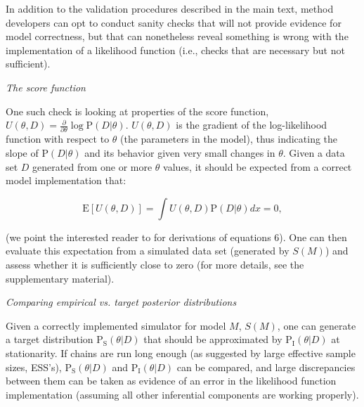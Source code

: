\documentclass[oneside]{article}
\begin{document}
\vspace{.25cm}
\begin{tcolorbox}[breakable, width=\textwidth, colback=gray!10, boxrule=0pt,
  title=Box 2: Additional validation sanity-checks, fonttitle=\bfseries]
  \small

  In addition to the validation procedures described in the main text,
  method developers can opt to conduct sanity checks that will not
  provide evidence for model correctness, but that can nonetheless
  reveal something is wrong with the implementation of a likelihood
  function (i.e., checks that are necessary but not sufficient).
  
  \vspace{.25cm}
  \emph{The score function}
  
  One such check is looking at properties of the score function,
  $U(\theta,D)=\frac{\partial}{\partial\theta}\log
  \text{P}(D|\theta)$.
  $U(\theta,D)$ is the gradient of the log-likelihood function with
  respect to $\theta$ (the parameters in the model), thus indicating
  the slope of $\text{P}(D|\theta)$ and its behavior given very small
  changes in $\theta$.
  Given a data set $D$ generated from one or more $\theta$ values, it
  should be expected from a correct model implementation that:

  \begin{equation}\label{eq:scorefunction}
    \text{E}[U(\theta,D)] = \int U(\theta,D)\text{P}(D|\theta)dx = 0,
  \end{equation}


  (we point the interested reader to {\color{red}{non-wiki citations here}} for derivations of equations 6).
  One can then evaluate this expectation from a simulated data set
  (generated by $S(M)$) and assess whether it is sufficiently close to
  zero (for more details, see the supplementary material).

  \vspace{.25cm}
  \emph{Comparing empirical vs. target posterior distributions}

  Given a correctly implemented simulator for model $M$, $S(M)$, one
  can generate a target distribution $\text{P}_{\text{S}}(\theta|D)$
  that should be approximated by $\text{P}_{\text{I}}(\theta|D)$ at stationarity.
  If chains are run long enough (as suggested by large effective
  sample sizes, ESS's), $\text{P}_{\text{S}}(\theta|D)$ and
  $\text{P}_{\text{I}}(\theta|D)$ can be compared, and large
  discrepancies between them can be taken as evidence of an error in the
  likelihood function implementation (assuming all other inferential
  components are working properly).


\end{tcolorbox}
\end{document}
